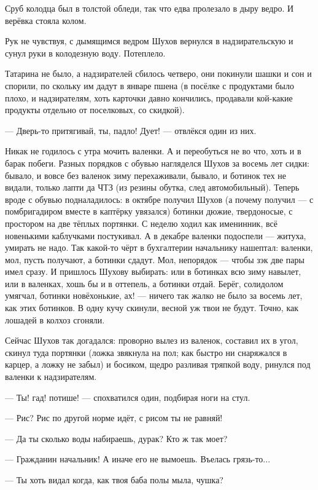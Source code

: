 Сруб колодца был в толстой обледи, так что едва пролезало в дыру ведро. И верёвка стояла
колом.

Рук не чувствуя, с дымящимся ведром Шухов вернулся в надзирательскую и сунул руки в
колодезную воду. Потеплело.

Татарина не было, а надзирателей сбилось четверо, они покинули шашки и сон и спорили, по
скольку им дадут в январе пшена (в посёлке с продуктами было плохо, и надзирателям, хоть
карточки давно кончились, продавали кой-какие продукты отдельно от поселковых, со скидкой).

--- Дверь-то притягивай, ты, падло! Дует! --- отвлёкся один из них.

Никак не годилось с утра мочить валенки. А и переобуться не во что, хоть и в барак побеги.
Разных порядков с обувью нагляделся Шухов за восемь лет сидки: бывало, и вовсе без валенок
зиму перехаживали, бывало, и ботинок тех не видали, только лапти да ЧТЗ (из резины обутка,
след автомобильный). Теперь вроде с обувью подналадилось: в октябре получил Шухов (а почему
получил --- с помбригадиром вместе в каптёрку увязался) ботинки дюжие, твердоносые, с
простором на две тёплых портянки. С неделю ходил как именинник, всё новенькими каблучками
постукивал. А в декабре валенки подоспели --- житуха, умирать не надо. Так какой-то чёрт в
бухгалтерии начальнику нашептал: валенки, мол, пусть получают, а ботинки сдадут. Мол,
непорядок --- чтобы зэк две пары имел сразу. И пришлось Шухову выбирать: или в ботинках всю
зиму навылет, или в валенках, хошь бы и в оттепель, а ботинки отдай. Берёг, солидолом умягчал,
ботинки новёхонькие, ах! --- ничего так жалко не было за восемь лет, как этих ботинков. В одну
кучу скинули, весной уж твои не будут. Точно, как лошадей в колхоз сгоняли.

Сейчас Шухов так догадался: проворно вылез из валенок, составил их в угол, скинул туда
портянки (ложка звякнула на пол; как быстро ни снаряжался в карцер, а ложку не забыл) и
босиком, щедро разливая тряпкой воду, ринулся под валенки к надзирателям.

--- Ты! гад! потише! --- спохватился один, подбирая ноги на стул.

--- Рис? Рис по другой норме идёт, с рисом ты не равняй!

--- Да ты сколько воды набираешь, дурак? Кто ж так моет?

--- Гражданин начальник! А иначе его не вымоешь. Въелась грязь-то...

--- Ты хоть видал когда, как твоя баба полы мыла, чушка?

